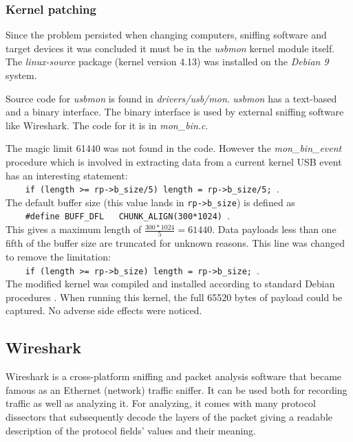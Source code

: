 \documentclass{article}
\begin{document}
\subsubsection{Kernel patching}
\label{kernelpatch}

Since the problem persisted when changing computers, sniffing software and target devices
it was concluded it must be in the {\it usbmon} kernel module itself.
The {\it linux-source} package (kernel version 4.13) was installed on the {\it Debian 9} system.

Source code for {\it usbmon} is found in {\it drivers/usb/mon}. {\it usbmon} has a
text-based and a binary interface. The binary interface is used by external sniffing
software like Wireshark. The code for it is in {\it mon\_bin.c}.

The magic limit 61440 was not found in the code. However the {\it mon\_bin\_event} procedure
which is involved in extracting data from a current kernel USB event has an interesting statement: \\
\verb|    if (length >= rp->b_size/5) length = rp->b_size/5; |. \\
The default buffer size (this value lands in \verb|rp->b_size|) is defined as \\
\verb|    #define BUFF_DFL   CHUNK_ALIGN(300*1024) |. \\
This gives a maximum length of $\frac{300*1024}{5} = 61440$. Data payloads less
than one fifth of the buffer size are truncated for unknown reasons.
This line was changed to remove the limitation: \\
\verb|    if (length >= rp->b_size) length = rp->b_size; |. \\
The modified kernel was compiled and installed according to standard Debian procedures \cite{debkernel}.
When running this kernel, the full 65520 bytes of payload could be captured.
No adverse side effects were noticed.

\subsection{Wireshark}

Wireshark \cite{wireshark} is a cross-platform sniffing and packet analysis software that
became famous as an Ethernet (network) traffic sniffer.
It can be used both for recording traffic as well as analyzing it.
For analyzing, it comes with many protocol dissectors that subsequently
decode the layers of the packet giving a readable description of the protocol fields'
values and their meaning.
\end{document}
